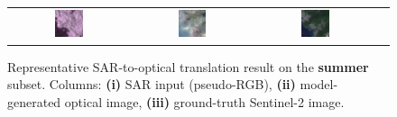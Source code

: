 \begin{figure}[h!]
\begin{tabular}{c *{3}{c}}
        \includegraphics[width=0.25\textwidth]{img/seasons/summer/sample_000026_sar_pseudo.png} &
        \includegraphics[width=0.25\textwidth]{img/seasons/summer/sample_000026_pred_rgb.png} &
        \includegraphics[width=0.25\textwidth]{img/seasons/summer/sample_000026_true_rgb.png} \\
    \end{tabular}
    \caption[Qualitative results on the summer subset]{%
    Representative SAR-to-optical translation result on the \textbf{summer} subset. 
    Columns: \textbf{(i)} SAR input (pseudo-RGB), 
    \textbf{(ii)} model-generated optical image, 
    \textbf{(iii)} ground-truth Sentinel-2 image.
    }
    \label{fig:appendix_summer}
\end{figure}

